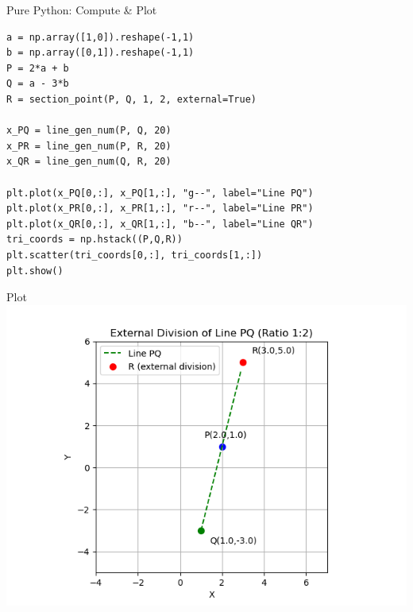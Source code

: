 \documentclass{beamer}
\begin{document}
\begin{frame}[fragile]{Pure Python: Compute \& Plot}
\begin{lstlisting}[style=PyStyle]
a = np.array([1,0]).reshape(-1,1)
b = np.array([0,1]).reshape(-1,1)
P = 2*a + b
Q = a - 3*b
R = section_point(P, Q, 1, 2, external=True)

x_PQ = line_gen_num(P, Q, 20)
x_PR = line_gen_num(P, R, 20)
x_QR = line_gen_num(Q, R, 20)

plt.plot(x_PQ[0,:], x_PQ[1,:], "g--", label="Line PQ")
plt.plot(x_PR[0,:], x_PR[1,:], "r--", label="Line PR")
plt.plot(x_QR[0,:], x_QR[1,:], "b--", label="Line QR")
tri_coords = np.hstack((P,Q,R))
plt.scatter(tri_coords[0,:], tri_coords[1,:])
plt.show()
\end{lstlisting}
\end{frame}
\begin{frame}{Plot}
    \centering
    \includegraphics[width=\columnwidth, height=0.8\textheight, keepaspectratio]{figs/section_graph.png}     
\end{frame}
\end{document}
